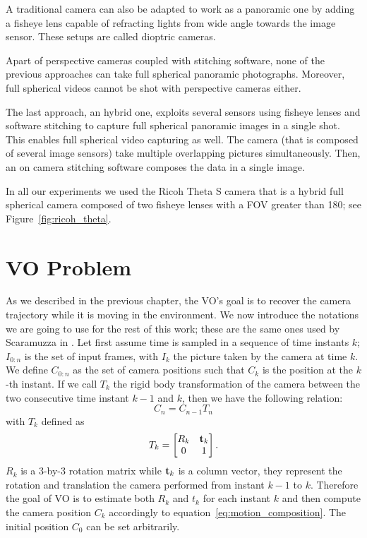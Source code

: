 A traditional camera can also be adapted to work as a panoramic one by adding a fisheye lens capable of refracting lights from wide angle towards the image sensor. These setups are called dioptric cameras.

Apart of perspective cameras coupled with stitching software, none of the previous approaches can take full spherical panoramic photographs. Moreover, full spherical videos cannot be shot with perspective cameras either.

The last approach, an hybrid one, exploits several sensors using fisheye lenses and software stitching to capture full spherical panoramic images in a single shot. This enables full spherical video capturing as well. The camera (that is composed of several image sensors) take multiple overlapping pictures simultaneously. Then, an on camera stitching software composes the data in a single image.

In all our experiments we used the Ricoh Theta S camera that is a hybrid full spherical camera 
composed of two fisheye lenses with a FOV greater than 180\degree; see Figure~\ref{fig:ricoh_theta}.
%
%

\section{VO Problem}
\label{sec:vo_problem}
As we described in the previous chapter, the VO's goal is to recover the 
camera trajectory while it is moving in the environment. We now
introduce the notations we are going to use for the rest of this work; 
these are the same ones used by Scaramuzza in \cite{scaramuzzaVisualOdometryI}.
Let first assume time is sampled in a sequence of time instants \(k\); 
\(I_{0:n} \) is the set of input frames, with \(I_{k}\) the picture taken by 
the camera at time
\(k\). We define \(C_{0:n}\) as the set of camera 
positions such that \(C_k\) is the position at the \(k\)-th instant.
If we call \(T_k\) the rigid body transformation of the camera between the two
consecutive time instant $k-1$ and $k$, then we have the following relation:
\begin{equation}
	\label{eq:motion_composition}
C_n = C_{n-1} T_n
\end{equation}
\noindent with \(T_k\) defined as
\begin{equation*}
	T_k =
	\begin{bmatrix}
	R_k & \mathbf{t}_k \\
	0 & 1
	\end{bmatrix} \text{.}
\end{equation*}
\noindent $R_k$ is a 3-by-3 rotation matrix while $\mathbf{t}_k$ is a column vector, 
they represent the rotation and translation the camera performed from instant 
$k-1$ to $k$.
Therefore the goal of VO is to estimate both $R_k$ and $t_k$ for each instant 
$k$ and then compute the camera position $C_k$ accordingly to 
equation~\ref{eq:motion_composition}.
The initial position $C_0$ can be set arbitrarily.

